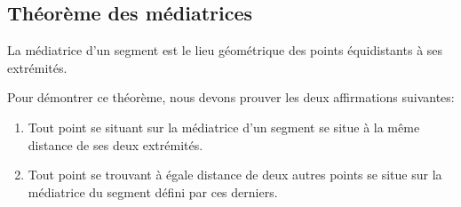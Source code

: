 \documentclass[a4paper,12pt]{article}
\begin{document}
\subsection{Théorème des médiatrices}

\begin{theorem}
La médiatrice d'un segment est le lieu géométrique des points équidistants à ses extrémités.
\end{theorem}


Pour démontrer ce théorème, nous devons prouver les deux affirmations suivantes:
\begin{enumerate}
    \item Tout point se situant sur la médiatrice d'un segment se situe à la même distance de ses deux extrémités.
    \item Tout point se trouvant à égale distance de deux autres points se situe sur la médiatrice du segment défini par ces derniers.\\
\end{enumerate}
\end{document}
